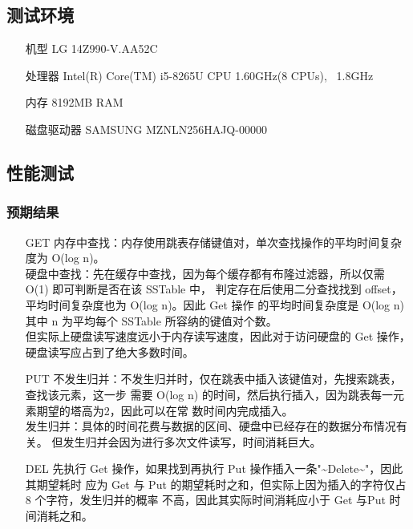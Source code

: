 \documentclass{article}
\begin{document}
\subsection{测试环境}
\begin{itemize}[align = left]
  \item [机型] LG 14Z990-V.AA52C
  \item [处理器] Intel(R) Core(TM) i5-8265U CPU \@ 1.60GHz(8 CPUs), ~1.8GHz
  \item [内存] 8192MB RAM
  \item [磁盘驱动器] SAMSUNG MZNLN256HAJQ-00000
\end{itemize}
\subsection{性能测试}

\subsubsection{预期结果}

\begin{itemize}
    \item [GET] 
    内存中查找：内存使用跳表存储键值对，单次查找操作的平均时间复杂度为 O(log n)。\\
    硬盘中查找：先在缓存中查找，因为每个缓存都有布隆过滤器，所以仅需 O(1) 即可判断是否在该 SSTable 中，
    判定存在后使用二分查找找到 offset，平均时间复杂度也为 O(log n)。因此 Get 操作
    的平均时间复杂度是 O(log n) 其中 n 为平均每个 SSTable 所容纳的键值对个数。 \\
    但实际上硬盘读写速度远小于内存读写速度，因此对于访问硬盘的 Get 操作，硬盘读写应占到了绝大多数时间。
    \item [PUT]
    不发生归并：不发生归并时，仅在跳表中插入该键值对，先搜索跳表，查找该元素，这一步
    需要 O(log n) 的时间，然后执行插入，因为跳表每一元素期望的塔高为2，因此可以在常
    数时间内完成插入。\\
    发生归并：具体的时间花费与数据的区间、硬盘中已经存在的数据分布情况有关。
    但发生归并会因为进行多次文件读写，时间消耗巨大。
    \item [DEL]
    先执行 Get 操作，如果找到再执行 Put 操作插入一条"\~{}Delete\~{}"，因此其期望耗时
    应为 Get 与 Put 的期望耗时之和，但实际上因为插入的字符仅占 8 个字符，发生归并的概率
    不高，因此其实际时间消耗应小于 Get 与Put 时间消耗之和。
\end{itemize}
\end{document}
